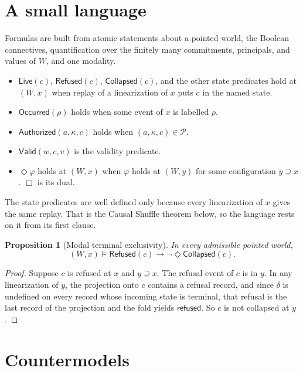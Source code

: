 \documentclass[11pt,openany]{book}
\newtheorem{proposition}[theorem]{Proposition}
\theoremstyle{remark}
\begin{document}
\section{A small language}

Formulas are built from atomic statements about a pointed world, the
Boolean connectives, quantification over the finitely many commitments,
principals, and values of $W$, and one modality.
\begin{itemize}[leftmargin=1.5em]
\item $\mathsf{Live}(c)$, $\mathsf{Refused}(c)$, $\mathsf{Collapsed}(c)$,
and the other state predicates hold at $(W,x)$ when replay of a
linearization of $x$ puts $c$ in the named state.
\item $\mathsf{Occurred}(\rho)$ holds when some event of $x$ is labelled
$\rho$.
\item $\mathsf{Authorized}(a,\kappa,c)$ holds when $(a,\kappa,c)\in\mathcal P$.
\item $\mathsf{Valid}(w,c,v)$ is the validity predicate.
\item $\Diamond\varphi$ holds at $(W,x)$ when $\varphi$ holds at $(W,y)$
for some configuration $y\supseteq x$. $\Box$ is its dual.
\end{itemize}

The state predicates are well defined only because every linearization of
$x$ gives the same replay. That is the Causal Shuffle theorem below, so
the language rests on it from its first clause.

\begin{proposition}[Modal terminal exclusivity]\label{prop:modal-terminal}
In every admissible pointed world,
\[
(W,x)\models\mathsf{Refused}(c)\rightarrow\neg\Diamond\mathsf{Collapsed}(c).
\]
\end{proposition}

\begin{proof}
Suppose $c$ is refused at $x$ and $y\supseteq x$. The refusal event of $c$
is in $y$. In any linearization of $y$, the projection onto $c$ contains a
refusal record, and since $\delta$ is undefined on every record whose
incoming state is terminal, that refusal is the last record of the
projection and the fold yields $\mathsf{refused}$. So $c$ is not collapsed
at $y$.
\end{proof}

\section{Countermodels}
\end{document}
